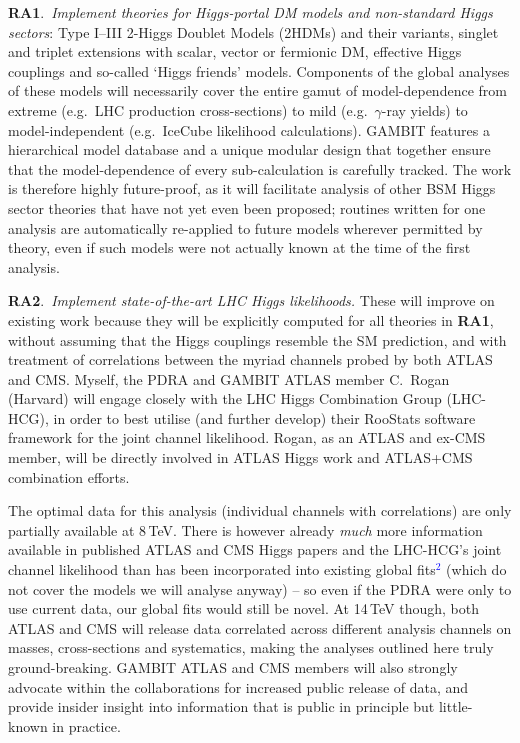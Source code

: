 \documentclass[11pt,oneside,twocolumn,a4paper]{article}
\begin{document}
\textbf{RA1}.\ \textit{Implement theories for Higgs-portal DM models and non-standard Higgs sectors}: Type I--III 2-Higgs Doublet Models (2HDMs) and their variants, singlet and triplet extensions with scalar, vector or fermionic DM, effective Higgs couplings and so-called `Higgs friends' models.  Components of the global analyses of these models will necessarily cover the entire gamut of model-dependence from extreme (e.g.\ LHC production cross-sections) to mild (e.g.\ $\gamma$-ray yields) to model-independent (e.g.\ IceCube likelihood calculations).  GAMBIT features a hierarchical model database and a unique modular design that together ensure that the model-dependence of every sub-calculation is carefully tracked.  The work is therefore highly future-proof, as it will facilitate analysis of other BSM Higgs sector theories that have not yet even been proposed; routines written for one analysis are automatically re-applied to future models wherever permitted by theory, even if such models were not actually known at the time of the first analysis.

\textbf{RA2}.\ \textit{Implement state-of-the-art LHC Higgs likelihoods.}  These will improve on existing work because they will be explicitly computed for all theories in \textbf{RA1}, without assuming that the Higgs couplings resemble the SM prediction, and with treatment of correlations between the myriad channels probed by both ATLAS and CMS.  Myself, the PDRA and GAMBIT ATLAS member C.\ Rogan (Harvard) will engage closely with the LHC Higgs Combination Group (LHC-HCG), in order to best utilise (and further develop) their RooStats software framework for the joint channel likelihood.  Rogan, as an ATLAS and ex-CMS member, will be directly involved in ATLAS Higgs work and ATLAS+CMS combination efforts.

The optimal data for this analysis (individual channels with correlations) are only partially available at 8\,TeV.  There is however already \textit{much} more information available in published ATLAS and CMS Higgs papers and the LHC-HCG's joint channel likelihood than has been incorporated into existing global fits\textcolor{blue}{$^2$} (which do not cover the models we will analyse anyway) -- so even if the PDRA were only to use current data, our global fits would still be novel.  At 14\,TeV though, both ATLAS and CMS will release data correlated across different analysis channels on masses, cross-sections and systematics, making the analyses outlined here truly ground-breaking.  GAMBIT ATLAS and CMS members will also strongly advocate within the collaborations for increased public release of data, and provide insider insight into information that is public in principle but little-known in practice.
\end{document}

